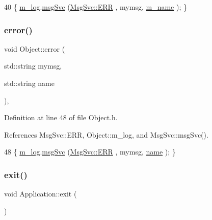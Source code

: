 \begin{DoxyCode}
40 \{ \hyperlink{classObject_a0d269813dd7ac1f24bc143031e2963f2}{m\_log}.\hyperlink{classMsgSvc_ad25f18047920cc59a314e5098259711c}{msgSvc} (\hyperlink{classMsgSvc_ae671eb7301996cd049d2da8a65925926a35a9d7166e9896af4ec8fb33bf5f1772}{MsgSvc::ERR}     , mymsg, \hyperlink{classObject_a8b83c95c705d2c3ba0d081fe1710f48d}{m\_name} ); \}
\end{DoxyCode}
\mbox{\label{classObject_ad7f6c457733082efa2f9ff5f5c8e119a}} 
\subsubsection{\texorpdfstring{error()}{error()}\hspace{0.1cm}{\footnotesize\ttfamily [2/2]}}
{\footnotesize\ttfamily void Object\+::error (\begin{DoxyParamCaption}\item[{std\+::string}]{mymsg,  }\item[{std\+::string}]{name }\end{DoxyParamCaption})\hspace{0.3cm}{\ttfamily [inline]}, {\ttfamily [inherited]}}



Definition at line 48 of file Object.\+h.



References Msg\+Svc\+::\+E\+RR, Object\+::m\+\_\+log, and Msg\+Svc\+::msg\+Svc().


\begin{DoxyCode}
48 \{ \hyperlink{classObject_a0d269813dd7ac1f24bc143031e2963f2}{m\_log}.\hyperlink{classMsgSvc_ad25f18047920cc59a314e5098259711c}{msgSvc} (\hyperlink{classMsgSvc_ae671eb7301996cd049d2da8a65925926a35a9d7166e9896af4ec8fb33bf5f1772}{MsgSvc::ERR}     , mymsg, \hyperlink{classObject_a300f4c05dd468c7bb8b3c968868443c1}{name} ); \}
\end{DoxyCode}
\mbox{\label{classApplication_a3c8a98d6c10a5b054800488df16cdbcb}} 
\subsubsection{\texorpdfstring{exit()}{exit()}}
{\footnotesize\ttfamily void Application\+::exit (\begin{DoxyParamCaption}{ }\end{DoxyParamCaption})}

